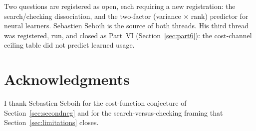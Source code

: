 Two questions are registered as open, each requiring a new registration: the search/checking dissociation, and the two-factor (variance $\times$ rank) predictor for neural learners. Sebastien Seboih is the source of both threads. His third thread was registered, run, and closed as Part~VI (Section~\ref{sec:part6}): the cost-channel ceiling table did not predict learned usage.

\section*{Acknowledgments}

I thank Sebastien Seboih for the cost-function conjecture of Section~\ref{sec:secondneg} and for the search-versus-checking framing that Section~\ref{sec:limitations} closes.
